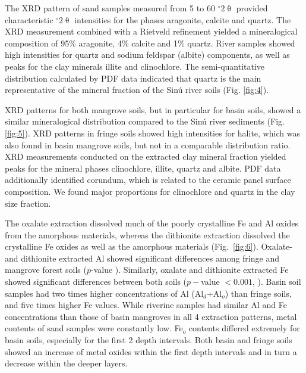 The XRD pattern of sand samples measured from 5 to 60 $^{\circ}2\uptheta$ provided characteristic $^{\circ}2\uptheta$ intensities for the phases aragonite, calcite and quartz. The XRD measurement combined with a Rietveld refinement yielded a mineralogical composition of 95\% aragonite, 4\% calcite and 1\% quartz.
River samples showed high intensities for quartz and sodium feldspar (albite) components, as well as peaks for the clay minerals illite and clinochlore. The semi-quantitative distribution calculated by PDF data indicated that quartz is the main representative of the mineral fraction of the Sin\'{u} river soils (Fig. \ref{fig:4}).

XRD patterns for both mangrove soils, but in particular for basin soils, showed a similar mineralogical distribution compared to the Sin\'{u} river sediments (Fig. \ref{fig:5}). XRD patterns in fringe soils showed high intensities for halite, which was also found in basin mangrove soils, but not in a comparable distribution ratio.
XRD measurements conducted on the extracted clay mineral fraction yielded peaks for the mineral phases clinochlore, illite, quartz and albite. PDF data additionally identified corundum, which is related to the ceramic panel surface composition. We found major proportions for clinochlore and quartz in the clay size fraction. 

The oxalate extraction dissolved much of the poorly crystalline Fe and Al oxides from the amorphous materials, whereas the dithionite extraction dissolved the crystalline Fe oxides as well as the amorphous materials \mbox{(Fig. \ref{fig:6})}. Oxalate- and dithionite extracted Al showed significant differences among fringe and mangrove forest soils ($p$-value \DIFdelbegin {}\DIFdelend \DIFaddbegin {}\DIFaddend ). Similarly, oxalate and dithionite extracted Fe showed significant differences between both soils ($p-$value $< 0.001$, \DIFdelbegin {}\DIFdelend \DIFaddbegin {}\DIFaddend ).
Basin soil samples had two times higher concentrations of Al (Al$_d$+Al$_o$) than fringe soils, and five times higher Fe values. While riverine samples had similar Al and Fe concentrations than those of basin mangroves in all 4 extraction patterns, metal contents of sand samples were constantly low. Fe$_o$ contents differed extremely for basin soils, especially for the first 2 depth intervals. Both basin and fringe soils showed an increase of metal oxides within the first depth intervals and in turn a decrease within the deeper layers.


